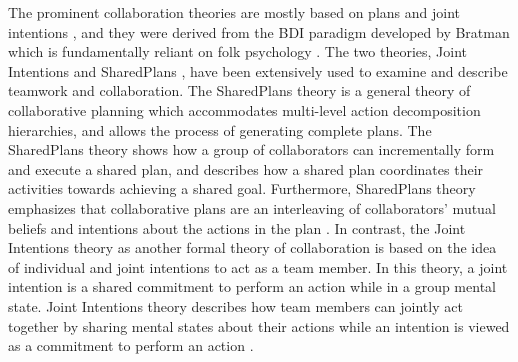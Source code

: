 The prominent collaboration theories are mostly based on plans and joint
intentions \cite{cohen:teamwork,grosz:plans-discourse}, and they were derived
from the BDI paradigm developed by Bratman \cite{bratman:intentions-plans} which
is fundamentally reliant on folk psychology \cite{ravenscroft:folk}. The two
theories, Joint Intentions \cite{cohen:teamwork} and SharedPlans
\cite{grosz:plans-discourse}, have been extensively used to examine and describe
teamwork and collaboration. The SharedPlans theory is a general theory of
collaborative planning which accommodates multi-level action decomposition
hierarchies, and allows the process of generating complete plans. The
SharedPlans theory shows how a group of collaborators can incrementally form and
execute a shared plan, and describes how a shared plan coordinates their
activities towards achieving a shared goal. Furthermore, SharedPlans theory
emphasizes that collaborative plans are an interleaving of collaborators' mutual
beliefs and intentions about the actions in the plan
\cite{grosz:planning-acting,grosz:collaboration,grosz:plans-discourse}. In
contrast, the Joint Intentions theory as another formal theory of collaboration
is based on the idea of individual and joint intentions to act as a team member.
In this theory, a joint intention is a shared commitment to perform an action
while in a group mental state. Joint Intentions theory describes how team
members can jointly act together by sharing mental states about their actions
while an intention is viewed as a commitment to perform an action
\cite{cohen:teamwork}.

